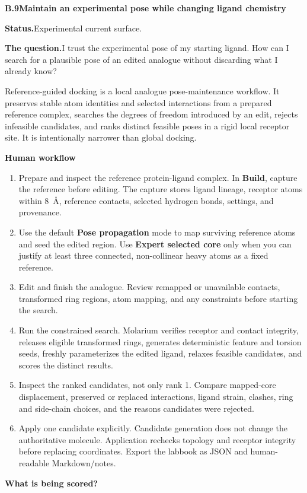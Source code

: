 \documentclass[10pt,letterpaper]{article}
\newcommand{\lead}[1]{\textbf{#1}\hspace{0.35em}}
\newcommand{\subhead}[1]{%
  \par\needspace{2\baselineskip}\vspace{2.5pt}%
  {\fontsize{10.91}{13.1}\selectfont\bfseries #1}\par\vspace{-1.5pt}}
\newcommand{\workflowsection}[4]{%
  \par\needspace{5\baselineskip}\vspace{7.5pt}%
  {\fontsize{10.91}{13.1}\selectfont\bfseries #1\hspace{1.1em}#2}\par\vspace{2pt}%
  \lead{Status.}#3.\par\vspace{-3.5pt}%
  \lead{The question.}#4\par}
\begin{document}
\workflowsection{B.9}{Maintain an experimental pose while changing ligand chemistry}{Experimental current surface}{I trust the experimental pose of my starting ligand. How can I search for a plausible pose of an edited analogue without discarding what I already know?}

Reference-guided docking is a local analogue pose-maintenance workflow. It preserves stable atom identities and selected interactions from a prepared reference complex, searches the degrees of freedom introduced by an edit, rejects infeasible candidates, and ranks distinct feasible poses in a rigid local receptor site. It is intentionally narrower than global docking.

\subhead{Human workflow}

\begin{enumerate}
\item Prepare and inspect the reference protein-ligand complex. In \textbf{Build}, capture the reference before editing. The capture stores ligand lineage, receptor atoms within 8~\AA, reference contacts, selected hydrogen bonds, settings, and provenance.
\item Use the default \textbf{Pose propagation} mode to map surviving reference atoms and seed the edited region. Use \textbf{Expert selected core} only when you can justify at least three connected, non-collinear heavy atoms as a fixed reference.
\item Edit and finish the analogue. Review remapped or unavailable contacts, transformed ring regions, atom mapping, and any constraints before starting the search.
\item Run the constrained search. Molarium verifies receptor and contact integrity, releases eligible transformed rings, generates deterministic feature and torsion seeds, freshly parameterizes the edited ligand, relaxes feasible candidates, and scores the distinct results.
\item Inspect the ranked candidates, not only rank 1. Compare mapped-core displacement, preserved or replaced interactions, ligand strain, clashes, ring and side-chain choices, and the reasons candidates were rejected.
\item Apply one candidate explicitly. Candidate generation does not change the authoritative molecule. Application rechecks topology and receptor integrity before replacing coordinates. Export the labbook as JSON and human-readable Markdown/notes.
\end{enumerate}

\subhead{What is being scored?}
\end{document}
